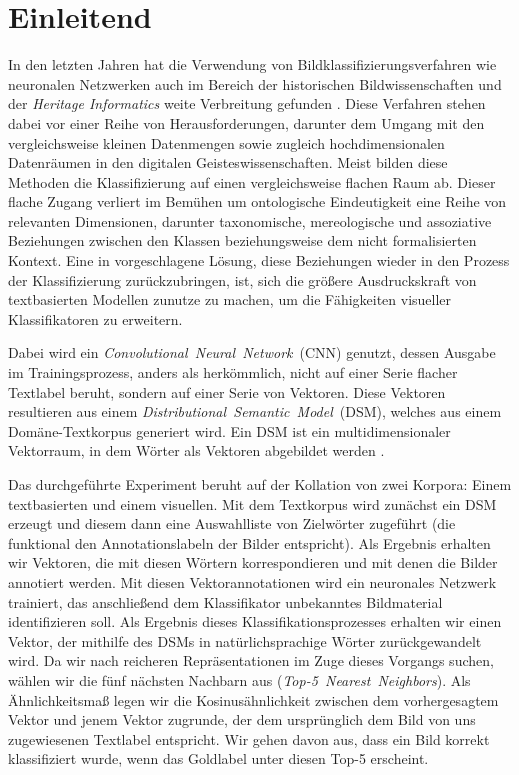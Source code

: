 \section{Einleitend}
In den letzten Jahren hat die Verwendung von Bildklassifizierungsverfahren wie neuronalen Netzwerken auch im Bereich der historischen Bildwissenschaften und der \emph{Heritage Informatics} weite Verbreitung gefunden \parencite{lang_AttestingSimilaritySupportingOrganizationStudy_2018}. Diese Verfahren stehen dabei vor einer Reihe von Herausforderungen, darunter dem Umgang mit den vergleichsweise kleinen Datenmengen sowie zugleich hochdimensionalen Datenräumen in den digitalen Geisteswissenschaften. Meist bilden diese Methoden die Klassifizierung auf einen vergleichsweise flachen Raum ab. Dieser flache Zugang verliert im Bemühen um ontologische Eindeutigkeit eine Reihe von relevanten Dimensionen, darunter taxonomische, mereologische und assoziative Beziehungen zwischen den Klassen beziehungsweise dem nicht formalisierten Kontext. Eine in \parencite{donig_VomBildTextUndWieder_2019a} vorgeschlagene Lösung, diese Beziehungen wieder in den Prozess der Klassifizierung zurückzubringen, ist, sich die größere Ausdruckskraft von textbasierten Modellen zunutze zu machen, um die Fähigkeiten visueller Klassifikatoren zu erweitern. 

Dabei wird ein \mbox{\emph{Convolutional Neural Network} (CNN)} genutzt, dessen Ausgabe im Trainingsprozess, anders als herkömmlich, nicht auf einer Serie flacher Textlabel beruht, sondern auf einer Serie von Vektoren. Diese Vektoren resultieren aus einem \mbox{\emph{Distributional Semantic Model} (DSM)}, welches aus einem Domäne-Textkorpus generiert wird. Ein DSM ist ein multidimensionaler Vektorraum, in dem Wörter als Vektoren abgebildet werden \parencite{lenci_DistributionalModelsWordMeaning_2018a}.

Das durchgeführte Experiment beruht auf der Kollation von zwei Korpora: Einem textbasierten und einem visuellen. Mit dem Textkorpus wird zunächst ein DSM erzeugt und diesem dann eine Auswahlliste von Zielwörter zugeführt (die funktional den Annotationslabeln der Bilder entspricht). Als Ergebnis erhalten wir Vektoren, die mit diesen Wörtern korrespondieren und mit denen die Bilder annotiert werden. Mit diesen Vektorannotationen wird ein neuronales Netzwerk trainiert, das anschließend dem Klassifikator unbekanntes Bildmaterial identifizieren soll. Als Ergebnis dieses Klassifikationsprozesses erhalten wir einen Vektor, der mithilfe des DSMs in natürlichsprachige Wörter zurückgewandelt wird. Da wir nach reicheren Repräsentationen im Zuge dieses Vorgangs suchen, wählen wir die fünf nächsten Nachbarn aus (\mbox{\emph{Top-5 Nearest Neighbors}}). Als Ähnlichkeitsmaß legen wir die Kosinusähnlichkeit zwischen dem vorhergesagtem Vektor und jenem Vektor zugrunde, der dem ursprünglich dem Bild von uns zugewiesenen Textlabel entspricht. Wir gehen davon aus, dass ein Bild korrekt klassifiziert wurde, wenn das Goldlabel unter diesen Top-5 erscheint.

